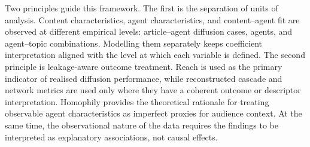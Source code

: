 Two principles guide this framework. The first is the separation of units of analysis. Content characteristics, agent characteristics, and content–agent fit are observed at different empirical levels: article–agent diffusion cases, agents, and agent–topic combinations. Modelling them separately keeps coefficient interpretation aligned with the level at which each variable is defined. The second principle is leakage-aware outcome treatment. Reach is used as the primary indicator of realised diffusion performance, while reconstructed cascade and network metrics are used only where they have a coherent outcome or descriptor interpretation. Homophily provides the theoretical rationale for treating observable agent characteristics as imperfect proxies for audience context. At the same time, the observational nature of the data requires the findings to be interpreted as explanatory associations, not causal effects.
